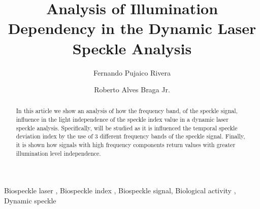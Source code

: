 \documentclass[review]{elsarticle}
\begin{document}
 

\begin{frontmatter}

\title{Analysis of Illumination Dependency  in the Dynamic Laser Speckle Analysis}



\author{Fernando Pujaico Rivera}
\author{Roberto Alves Braga Jr.}



\address{University Federal of Lavras, Lavras, Brazil}
% 


\begin{abstract}
In this article we show an analysis of how the frequency band,
of the speckle signal, influence in the
light independence of the speckle index value in a dynamic laser speckle analysis. 
Specifically, 
will be studied as it is influenced the temporal speckle deviation 
index by the use of 3 different frequency bands of the speckle signal.
Finally, it is shown how signals with high frequency components return values with greater illumination level independence.
\end{abstract}

\begin{keyword}
Biospeckle laser \sep 
Biospeckle index \sep 
Biospeckle signal\sep 
Biological activity \sep
Dynamic speckle 
\end{keyword}

\end{frontmatter}

\linenumbers

\end{document}
